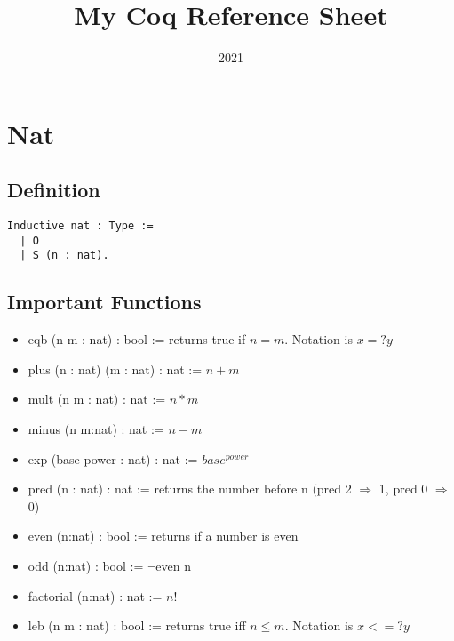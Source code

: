 \documentclass[12pt,a4paper]{article}
\author{}
\title{My Coq Reference Sheet}
\date{2021}
\theoremstyle{case}
\begin{document}
\maketitle



\section{Nat}
\subsection{Definition}
\begin{verbatim}
Inductive nat : Type :=
  | O
  | S (n : nat).
\end{verbatim}
\subsection{Important Functions}
\begin{itemize}
    \item eqb (n m : nat) : bool := returns true if $n=m$. Notation is $x =? y$
    \item plus (n : nat) (m : nat) : nat := $n + m$
    \item mult (n m : nat) : nat := $n*m$
    \item minus (n m:nat) : nat := $n-m$
    \item exp (base power : nat) : nat := $base^{power}$
    \item pred (n : nat) : nat := returns the number before n $($pred 2 $\Rightarrow$ 1, pred 0 $\Rightarrow$ 0)
    \item even (n:nat) : bool := returns if a number is even
    \item odd (n:nat) : bool := $\neg $even n
    \item factorial (n:nat) : nat := $n!$
    \item leb (n m : nat) : bool := returns true iff $n\leq m$. Notation is $x <=? y$
\end{itemize}
\end{document}
